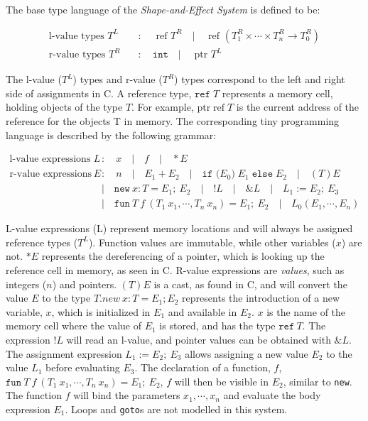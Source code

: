 \newpar The base type language of the \textit{Shape-and-Effect System} is defined to be:  

\begin{equation*}
\begin{aligned}
    \text {l-value types } T^{L} \quad &: \quad \text{ ref } T^{R} \quad | \quad \text{ ref } \left(T_{1}^{R} \times \cdots \times T_{n}^{R} \rightarrow T_{0}^{R}\right)\\
    \text {r-value types } T^{R} \quad &: \quad \texttt{int} \quad | \quad \text{ ptr } T^{L}
\end{aligned}
\end{equation*}

\newpar The l-value ($T^{L}$) types and r-value ($T^{R}$) types correspond to the left and right side of assignments in C. A reference type, $\texttt{ref} \; T$ represents a memory cell, holding objects of the type $T$. For example, $\text{ptr}\;\text{ref}\;T$ is the current address of the reference for the objects T in memory. The corresponding tiny programming language is described by the following grammar:

\begin{equation*}
\begin{aligned}
    \text {l-value expressions } L \quad &: \quad x \quad | \quad f \quad | \quad *E \\
    \text{r-value expressions } E \quad &: \quad n \quad | \quad E_{1}+E_{2} \quad | \quad \texttt{if (}E_0\texttt{)} \; E_1 \; \texttt{else} \; E_2 \quad | \quad (T) E \\
    &| \quad \texttt{new} \: x : T=E_1 ;\: E_2 \quad | \quad !L \quad | \quad \& L \quad | \quad L_1 := E_2 ;\: E_3 \\
    &| \quad \texttt{fun} \:T\:f\:(T_1\:x_1, \cdots, T_n\:x_n) = E_1 ;\: E_2 \quad | \quad L_0(E_1, \cdots, E_n)
\end{aligned}
\end{equation*}

\newpar L-value expressions (L) represent memory locations and will always be assigned reference types ($T^L$). Function values are immutable, while other variables ($x$) are not. $*E$ represents the dereferencing of a pointer, which is looking up the reference cell in memory, as seen in C. R-value expressions are \textit{values}, such as integers ($n$) and pointers. $(T)E$ is a cast, as found in C, and will convert the value $E$ to the type $T$.$new\: x : T = E_1; E_2$ represents the introduction of a new variable, $x$, which is initialized in $E_1$ and available in $E_2$. $x$ is the name of the memory cell where the value of $E_1$ is stored, and has the type $\texttt{ref} \:T$. The expression $!L$ will read an l-value, and pointer values can be obtained with $\&L$.
The assignment expression $L_1 := E_2 ;\: E_3$ allows assigning a new value $E_2$ to the value $L_1$ before evaluating $E_3$. The declaration of a function, $f$, $\texttt{fun} \:T\:f\:(T_1\:x_1, \cdots, T_n\:x_n) = E_1 ;\: E_2$, $f$ will then be visible in $E_2$, similar to \texttt{new}. The function $f$ will bind the parameters $x_1, \cdots, x_n$ and evaluate the body expression $E_1$. Loops and \texttt{goto}s are not modelled in this system. 

